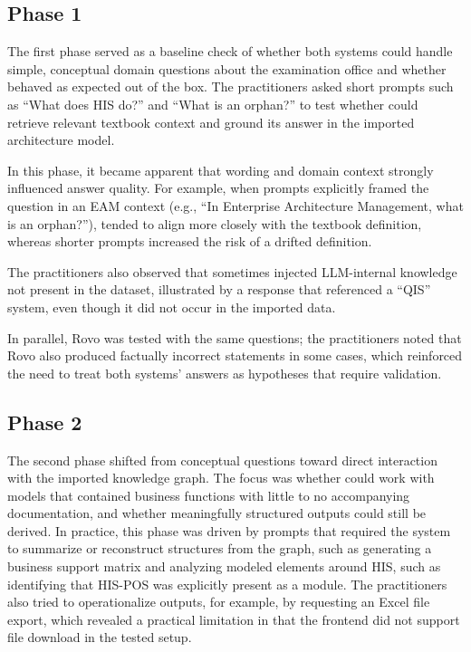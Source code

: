 \subsection{Phase 1}
\label{sub:phase1}
The first phase served as a baseline check of whether both systems could handle simple, conceptual domain questions about the examination office and whether \prototype{} behaved as expected out of the box. The practitioners asked short prompts such as “What does HIS do?” and “What is an orphan?” to test whether \prototype{} could  retrieve relevant textbook context and ground its answer in the imported architecture model.

In this phase, it became apparent that wording and domain context strongly influenced answer quality. For example, when prompts explicitly framed the question in an EAM context (e.g., “In Enterprise Architecture Management, what is an orphan?”), \prototype{} tended to align more closely with the textbook definition, whereas shorter prompts increased the risk of a drifted definition.

The practitioners also observed that \prototype{} sometimes injected LLM-internal knowledge not present in the dataset, illustrated by a response that referenced a “QIS” system, even though it did not occur in the imported data.

In parallel, Rovo was tested with the same questions; the practitioners noted that Rovo also produced factually incorrect statements in some cases, which reinforced the need to treat both systems’ answers as hypotheses that require validation.

\subsection{Phase 2}
\label{sub:phase2}
The second phase shifted from conceptual questions toward direct interaction with the imported knowledge graph. The focus was whether \prototype{} could work with models that contained business functions with little to no accompanying documentation, and whether meaningfully structured outputs could still be derived. In practice, this phase was driven by prompts that required the system to summarize or reconstruct structures from the graph, such as generating a business support matrix and analyzing modeled elements around HIS, such as identifying that HIS-POS was explicitly present as a module. The practitioners also tried to operationalize outputs, for example, by requesting an Excel file export, which revealed a practical limitation in that the frontend did not support file download in the tested setup.

